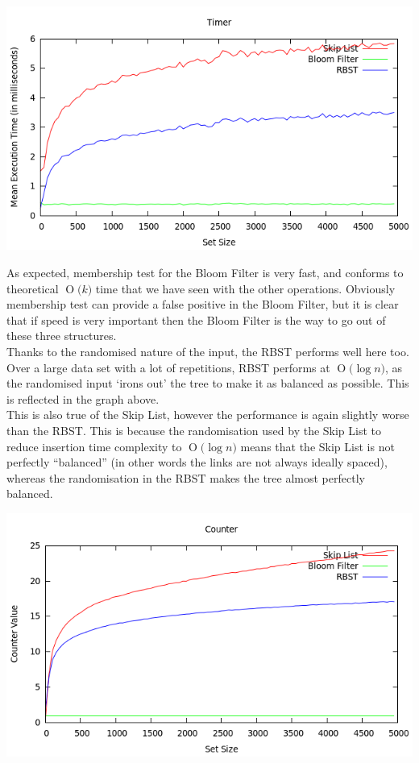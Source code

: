 \documentclass[11pt, notitlepage]{report}
\newcommand{\BigO}[1]{\ensuremath{\operatorname{O}\bigl(#1\bigr)}}
\begin{document}
\includegraphics[width=\linewidth]{img/Timer-Find}

As expected, membership test for the Bloom Filter is very fast, and conforms to theoretical \BigO{k} time that we have seen with the other operations. Obviously membership test can provide a false positive in the Bloom Filter, but it is clear that if speed is very important then the Bloom Filter is the way to go out of these three structures.\\

Thanks to the randomised nature of the input, the RBST performs well here too. Over a large data set with a lot of repetitions, RBST performs at \BigO{\log n}, as the randomised input `irons out' the tree to make it as balanced as possible. This is reflected in the graph above.\\

This is also true of the Skip List, however the performance is again slightly worse than the RBST. This is because the randomisation used by the Skip List to reduce insertion time complexity to \BigO{\log n} means that the Skip List is not perfectly ``balanced'' (in other words the links are not always ideally spaced), whereas the randomisation in the RBST makes the tree almost perfectly balanced.

\includegraphics[width=\linewidth]{img/Counter-Find}
\end{document}
